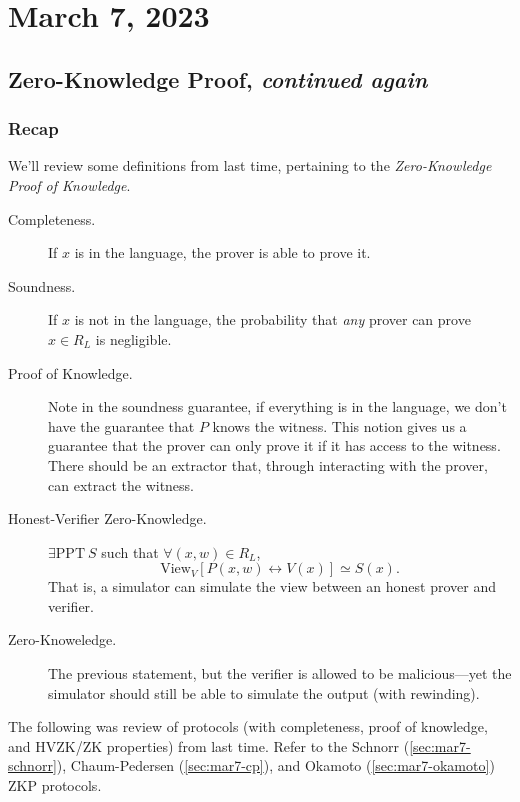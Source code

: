 \section{March 7, 2023}
\label{20230307}
\subsection{Zero-Knowledge Proof, \emph{continued again}}
\subsubsection{Recap}
We'll review some definitions from last time, pertaining to the \emph{Zero-Knowledge Proof of Knowledge}.
\begin{description}
    \item[Completeness.] If $x$ is in the language, the prover is able to prove it.
    \item[Soundness.] If $x$ is not in the language, the probability that \emph{any} prover can prove $x\in R_L$ is negligible.
    \item[Proof of Knowledge.] Note in the soundness guarantee, if everything is in the language, we don't have the guarantee that $P$ knows the witness. This notion gives us a guarantee that the prover can only prove it if it has access to the witness. There should be an extractor that, through interacting with the prover, can extract the witness.
    \item[Honest-Verifier Zero-Knowledge.] $\exists \mathrm{PPT}\ S$ such that $\forall (x, w)\in R_L$,
        \[\mathrm{View}_V[P(x, w)\leftrightarrow V(x)]\simeq S(x).\]
        That is, a simulator can simulate the view between an honest prover and verifier.
    \item[Zero-Knoweledge.] The previous statement, but the verifier is allowed to be malicious---yet the simulator should still be able to simulate the output (with rewinding).
\end{description}

The following was review of protocols (with completeness, proof of knowledge, and HVZK/ZK properties) from last time. Refer to the Schnorr (\cref{sec:mar7-schnorr}), Chaum-Pedersen (\cref{sec:mar7-cp}), and Okamoto (\cref{sec:mar7-okamoto}) ZKP protocols.

